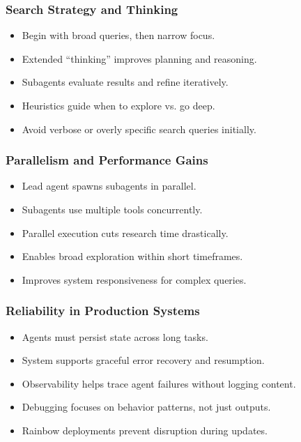 \begin{frame}[fragile]\frametitle{Search Strategy and Thinking}
    \begin{itemize}
        \item Begin with broad queries, then narrow focus.
        \item Extended “thinking” improves planning and reasoning.
        \item Subagents evaluate results and refine iteratively.
        \item Heuristics guide when to explore vs. go deep.
        \item Avoid verbose or overly specific search queries initially.
    \end{itemize}
\end{frame}

\begin{frame}[fragile]\frametitle{Parallelism and Performance Gains}
    \begin{itemize}
        \item Lead agent spawns subagents in parallel.
        \item Subagents use multiple tools concurrently.
        \item Parallel execution cuts research time drastically.
        \item Enables broad exploration within short timeframes.
        \item Improves system responsiveness for complex queries.
    \end{itemize}
\end{frame}

\begin{frame}[fragile]\frametitle{Reliability in Production Systems}
    \begin{itemize}
        \item Agents must persist state across long tasks.
        \item System supports graceful error recovery and resumption.
        \item Observability helps trace agent failures without logging content.
        \item Debugging focuses on behavior patterns, not just outputs.
        \item Rainbow deployments prevent disruption during updates.
    \end{itemize}
\end{frame}

